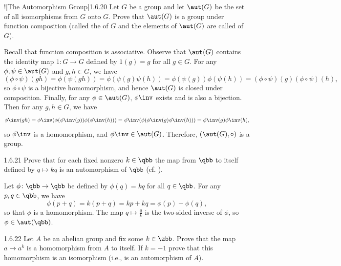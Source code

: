 \begin{exercise}![The Automorphism Group]{1.6.20}
    Let $G$ be a group and let $\aut(G)$ be the set of all isomorphisms from $G$ onto $G$.
	Prove that $\aut(G)$ is a group under function composition (called the  of $G$ and the elements of $\aut(G)$ are called  of $G$).
\end{exercise}

\begin{sol}
    Recall that function composition is associative.
    Observe that $\aut(G)$ contains the identity map $1 \colon G \to G$ defined by $1(g) = g$ for all $g \in G$.
    For any $\phi, \psi \in \aut(G)$ and $g, h \in G$, we have
    \[
        (\phi \circ \psi)(gh) = \phi(\psi(gh)) = \phi(\psi(g)\psi(h)) = \phi(\psi(g))\phi(\psi(h)) = (\phi \circ \psi)(g)(\phi \circ \psi)(h),
    \]
    so $\phi \circ \psi$ is a bijective homomorphism, and hence $\aut(G)$ is closed under composition.
    Finally, for any $\phi \in \aut(G)$, $\phi\inv$ exists and is also a bijection. 
    Then for any $g, h \in G$, we have
    \[
        \phi\inv(gh) = \phi\inv(\phi(\phi\inv(g))\phi(\phi\inv(h))) = \phi\inv(\phi(\phi\inv(g)\phi\inv(h))) = \phi\inv(g)\phi\inv(h),
    \]
    so $\phi\inv$ is a homomorphism, and $\phi\inv \in \aut(G)$.
    Therefore, $(\aut(G), \circ)$ is a group.
\end{sol}

\begin{exercise}{1.6.21}
    Prove that for each fixed nonzero $k \in \qbb$ the map from $\qbb$ to itself defined by $q \mapsto kq$ is an automorphism of $\qbb$ (cf. ).
\end{exercise}

\begin{sol}
    Let $\phi \colon \qbb \to \qbb$ be defined by $\phi(q) = kq$ for all $q \in \qbb$.
	For any $p, q \in \qbb$, we have
    \[
    	\phi(p + q) = k(p + q) = kp + kq = \phi(p) + \phi(q),
    \]
    so that $\phi$ is a homomorphism.
	The map $q \mapsto \frac{q}{k}$ is the two-sided inverse of $\phi$, so $\phi \in \aut(\qbb)$.
\end{sol}

\begin{exercise}{1.6.22}
    Let $A$ be an abelian group and fix some $k \in \zbb$.
	Prove that the map $a \mapsto a^k$ is a homomorphism from $A$ to itself.
	If $k = -1$ prove that this homomorphism is an isomorphism (i.e., is an automorphism of $A$).
\end{exercise}

